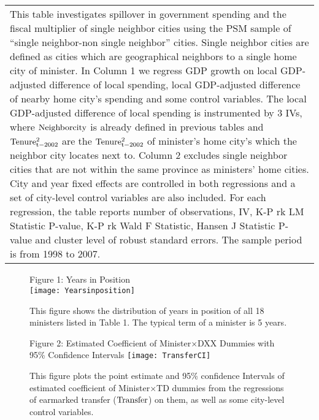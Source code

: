 \documentclass[11pt,a4paper]{article}
\begin{document}
\begin{center}
\begin{scriptsize}
{\begin{tabular}{l*{2}{c}}
\multicolumn{3}{p{12cm}}{\footnotesize This table investigates spillover in government spending and the fiscal multiplier of single neighbor cities using the PSM sample of ``single neighbor-non single neighbor'' cities. Single neighbor cities are defined as cities which are geographical neighbors to a single home city of minister. In Column 1 we regress GDP growth on local GDP-adjusted difference of local spending, local GDP-adjusted difference of nearby home city's spending and some control variables. The local GDP-adjusted difference of local spending is instrumented by 3 IVs, where \(\rm Neighborcity \) is already defined in previous tables and \(\rm Tenure_{t-2002}^2\) are the \(\rm Tenure_{t-2002}^2 \) of minister's home city's which the neighbor city locates next to. Column 2 excludes single neighbor cities that are not within the same province as ministers' home cities. City and year fixed effects are controlled in both regressions and a set of city-level control variables are also included. For each regression, the table reports number of observations, IV, K-P rk LM Statistic P-value, K-P rk Wald F Statistic, Hansen J Statistic P-value and cluster level of robust standard errors. The sample period is from 1998 to 2007.}\\
\end{tabular}
}
\end{scriptsize}
\end{center}


\newpage

\begin{figure}[htb]
\centering
Figure 1: Years in Position\\
\texttt{[image: Yearsinposition]}
\caption{This figure shows the distribution of years in position of all 18 ministers listed in Table 1. The typical term of a minister is 5 years. }
\end{figure}

\newpage


\begin{figure}[htb]
\centering
Figure 2: Estimated Coefficient of Minister\(\times\)DXX Dummies with 95\% Confidence Intervals
\texttt{[image: TransferCI]}
\caption{This figure plots the point estimate and 95\% confidence Intervals of estimated coefficient of Minister\(\times\)TD dummies from the regressions of earmarked transfer (${\rm Transfer}$) on them, as well as some city-level control variables.}
\end{figure}
\end{document}
